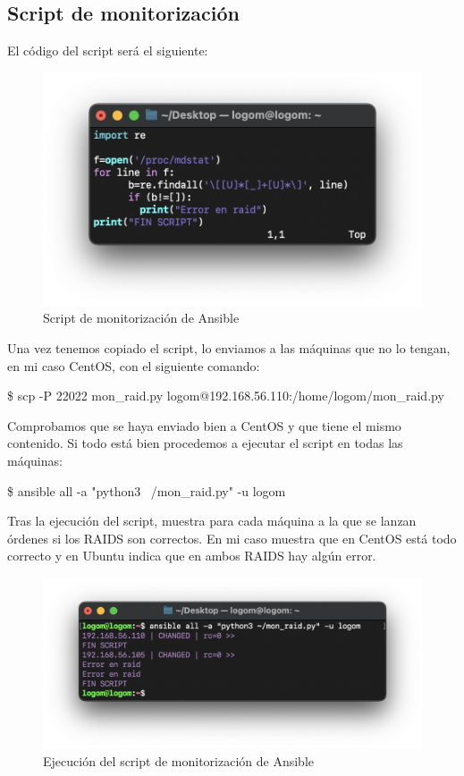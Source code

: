 \subsection{Script de monitorización}
El código del script será el siguiente:
    \begin{figure}[H]
        \centering
        \includegraphics[scale=0.5]{images/mon_raid.png}
        \caption{Script de monitorización de Ansible}
        \label{fig:mon_raid}
    \end{figure}

Una vez tenemos copiado el script, lo enviamos a las máquinas que no lo tengan, en mi caso CentOS, con el siguiente comando:
    \begin{tcolorbox}[colback=black!10, halign=left]
        \$ scp -P 22022 mon\_raid.py logom@192.168.56.110:/home/logom/mon\_raid.py
    \end{tcolorbox}

Comprobamos que se haya enviado bien a CentOS y que tiene el mismo contenido. Si todo está bien procedemos a ejecutar el script en todas las máquinas:
    \begin{tcolorbox}[colback=black!10, halign=left]
        \$ ansible all -a "python3 ~/mon\_raid.py" -u logom
    \end{tcolorbox}

Tras la ejecución del script, muestra para cada máquina a la que se lanzan órdenes si los RAIDS son correctos. En mi caso muestra que en CentOS está
todo correcto y en Ubuntu indica que en ambos RAIDS hay algún error.
    \begin{figure}[H]
        \centering
        \includegraphics[scale=0.7]{images/ejecucion_script.png}
        \caption{Ejecución del script de monitorización de Ansible}
        \label{fig:ejecucion_script}
    \end{figure}

